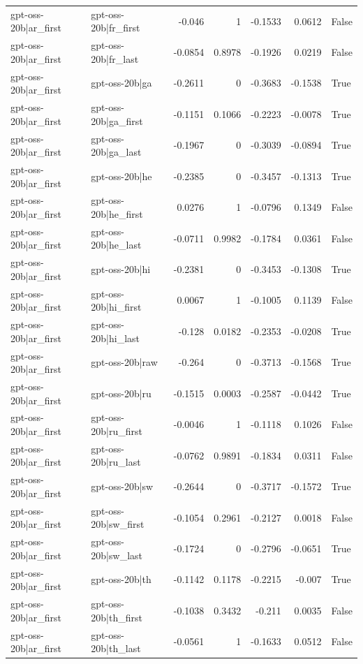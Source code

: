 \begin{table}
\begin{tabular}{l l r r r r l}
gpt-oss-20b|ar_first & gpt-oss-20b|fr_first & -0.046 & 1 & -0.1533 & 0.0612 & False \\
gpt-oss-20b|ar_first & gpt-oss-20b|fr_last & -0.0854 & 0.8978 & -0.1926 & 0.0219 & False \\
gpt-oss-20b|ar_first & gpt-oss-20b|ga & -0.2611 & 0 & -0.3683 & -0.1538 & True \\
gpt-oss-20b|ar_first & gpt-oss-20b|ga_first & -0.1151 & 0.1066 & -0.2223 & -0.0078 & True \\
gpt-oss-20b|ar_first & gpt-oss-20b|ga_last & -0.1967 & 0 & -0.3039 & -0.0894 & True \\
gpt-oss-20b|ar_first & gpt-oss-20b|he & -0.2385 & 0 & -0.3457 & -0.1313 & True \\
gpt-oss-20b|ar_first & gpt-oss-20b|he_first & 0.0276 & 1 & -0.0796 & 0.1349 & False \\
gpt-oss-20b|ar_first & gpt-oss-20b|he_last & -0.0711 & 0.9982 & -0.1784 & 0.0361 & False \\
gpt-oss-20b|ar_first & gpt-oss-20b|hi & -0.2381 & 0 & -0.3453 & -0.1308 & True \\
gpt-oss-20b|ar_first & gpt-oss-20b|hi_first & 0.0067 & 1 & -0.1005 & 0.1139 & False \\
gpt-oss-20b|ar_first & gpt-oss-20b|hi_last & -0.128 & 0.0182 & -0.2353 & -0.0208 & True \\
gpt-oss-20b|ar_first & gpt-oss-20b|raw & -0.264 & 0 & -0.3713 & -0.1568 & True \\
gpt-oss-20b|ar_first & gpt-oss-20b|ru & -0.1515 & 0.0003 & -0.2587 & -0.0442 & True \\
gpt-oss-20b|ar_first & gpt-oss-20b|ru_first & -0.0046 & 1 & -0.1118 & 0.1026 & False \\
gpt-oss-20b|ar_first & gpt-oss-20b|ru_last & -0.0762 & 0.9891 & -0.1834 & 0.0311 & False \\
gpt-oss-20b|ar_first & gpt-oss-20b|sw & -0.2644 & 0 & -0.3717 & -0.1572 & True \\
gpt-oss-20b|ar_first & gpt-oss-20b|sw_first & -0.1054 & 0.2961 & -0.2127 & 0.0018 & False \\
gpt-oss-20b|ar_first & gpt-oss-20b|sw_last & -0.1724 & 0 & -0.2796 & -0.0651 & True \\
gpt-oss-20b|ar_first & gpt-oss-20b|th & -0.1142 & 0.1178 & -0.2215 & -0.007 & True \\
gpt-oss-20b|ar_first & gpt-oss-20b|th_first & -0.1038 & 0.3432 & -0.211 & 0.0035 & False \\
gpt-oss-20b|ar_first & gpt-oss-20b|th_last & -0.0561 & 1 & -0.1633 & 0.0512 & False \\

\end{tabular}
\end{table}
